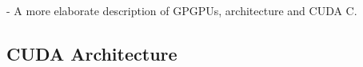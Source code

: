 		- A more elaborate description of GPGPUs, architecture and CUDA C.

\subsection{CUDA Architecture}
		
